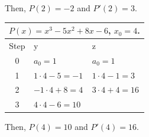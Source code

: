 \documentclass[12pt]{article}
\begin{document}
\begin{enumerate}
\begin{enumerate}
        Then, $P(2) = -2$ and $P'(2)=3$.

        \begin{tabular}{|c||l|l|}
            \hline
            \multicolumn{3}{|c|}{$P(x) = x^3 - 5x^2 + 8x -6$, $x_0 = 4$.}\\
            \hline
            Step & y & z\\
            \hline
            0 & $a_0 = 1$ & $a_0 = 1$\\
            1 & $1 \cdot 4 - 5 = -1$ & $1 \cdot 4 - 1 = 3$\\
            2 & $-1 \cdot 4 + 8 = 4$ & $3 \cdot 4 + 4 = 16$\\
            3 & $4 \cdot 4 - 6 = 10$ & \\
            \hline
        \end{tabular}

        Then, $P(4) = 10$ and $P'(4) = 16$.
    \end{enumerate}
\end{enumerate}
\end{document}
